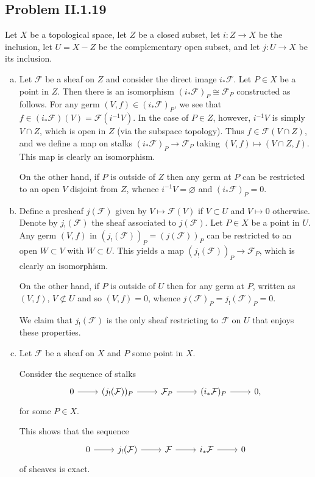 \documentclass{mathnotes}
\begin{document}
\subsection*{Problem II.1.19}
Let $X$ be a topological space, let $Z$ be a closed subset, let $i:Z\to X$ be the inclusion, let $U=X-Z$ be the complementary
open subset, and let $j:U\to X$ be its inclusion.
\begin{enumerate}[(a)]
    \item Let $\mathcal{F}$ be a sheaf on $Z$ and consider the direct image $i_*\mathcal{F}$. Let $P\in X$ be a point in $Z$.
        Then there is an isomorphism $(i_*\mathcal{F})_P\cong\mathcal{F}_P$ constructed as follows. For any germ $(V,f)\in(i_*\mathcal{F})_P$,
        we see that $f\in (i_*\mathcal{F})(V)=\mathcal{F}(i^{-1}V)$. In the case of $P\in Z$, however, $i^{-1}V$ is simply $V\cap Z$,
        which is open in $Z$ (via the subspace topology). Thus $f\in\mathcal{F}(V\cap Z)$, and we define a map on stalks $(i_*\mathcal{F})_P\to\mathcal{F}_P$
        taking $(V,f)\mapsto (V\cap Z,f)$. This map is clearly an isomorphism.
        
        On the other hand, if $P$ is outside of $Z$ then any germ at $P$ can be restricted to an open $V$ disjoint from $Z$, whence
        $i^{-1}V=\varnothing$ and $(i_*\mathcal{F})_P=0$.
    \item Define a presheaf $j(\mathcal{F})$ given by $V\mapsto\mathcal{F}(V)$ if $V\subset U$ and $V\mapsto 0$ otherwise. Denote
        by $j_!(\mathcal{F})$ the sheaf associated to $j(\mathcal{F})$. Let $P\in X$ be a point in $U$. Any germ $(V,f)$ in
        $(j_!(\mathcal{F}))_P=(j(\mathcal{F}))_P$ can be restricted to an open $W\subset V$ with $W\subset U$. This yields
        a map $(j_!(\mathcal{F}))_P\to\mathcal{F}_P$, which is clearly an isomorphism.

        On the other hand, if $P$ is outside of $U$ then for any germ at $P$, written as $(V,f)$, $V\not\subset U$ and so $(V,f)=0$,
        whence $j(\mathcal{F})_P=j_!(\mathcal{F})_P=0$.

        We claim that $j_!(\mathcal{F})$ is the only sheaf restricting to $\mathcal{F}$ on $U$ that enjoys these properties.
    \item Let $\mathcal{F}$ be a sheaf on $X$ and $P$ some point in $X$.
        
        Consider the sequence of stalks
        \begin{equation*}
            \begin{tikzcd}
                0\ar{r} & (j_!(\mathcal{F}))_P\ar{r} & \mathcal{F}_P\ar{r} & (i_*\mathcal{F})_P\ar{r} & 0,
            \end{tikzcd}
        \end{equation*}
        for some $P\in X$.

        This shows that the sequence
        \begin{equation*}
            \begin{tikzcd}
                0\ar{r} & j_!(\mathcal{F})\ar{r} & \mathcal{F}\ar{r} & i_*\mathcal{F}\ar{r} & 0
            \end{tikzcd}
        \end{equation*}
        of sheaves is exact.
\end{enumerate}
\end{document}
